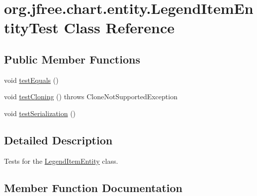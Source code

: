 \hypertarget{classorg_1_1jfree_1_1chart_1_1entity_1_1_legend_item_entity_test}{}\section{org.\+jfree.\+chart.\+entity.\+Legend\+Item\+Entity\+Test Class Reference}
\label{classorg_1_1jfree_1_1chart_1_1entity_1_1_legend_item_entity_test}
\subsection*{Public Member Functions}
\begin{DoxyCompactItemize}
\item 
void \mbox{\hyperlink{classorg_1_1jfree_1_1chart_1_1entity_1_1_legend_item_entity_test_a9ba295c277d8aa1443c3b39cd4821b50}{test\+Equals}} ()
\item 
void \mbox{\hyperlink{classorg_1_1jfree_1_1chart_1_1entity_1_1_legend_item_entity_test_afac7e430ef6dfc2d3ebfba129daf61b9}{test\+Cloning}} ()  throws Clone\+Not\+Supported\+Exception 
\item 
void \mbox{\hyperlink{classorg_1_1jfree_1_1chart_1_1entity_1_1_legend_item_entity_test_afd41b28ca3276c0a5ec17d4db0507b8c}{test\+Serialization}} ()
\end{DoxyCompactItemize}


\subsection{Detailed Description}
Tests for the \mbox{\hyperlink{classorg_1_1jfree_1_1chart_1_1entity_1_1_legend_item_entity}{Legend\+Item\+Entity}} class. 

\subsection{Member Function Documentation}
\mbox{\label{classorg_1_1jfree_1_1chart_1_1entity_1_1_legend_item_entity_test_afac7e430ef6dfc2d3ebfba129daf61b9}} 
